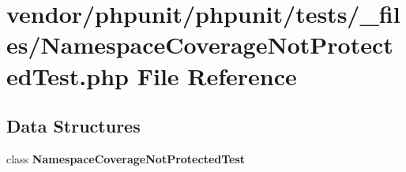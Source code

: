 \section{vendor/phpunit/phpunit/tests/\+\_\+files/\+Namespace\+Coverage\+Not\+Protected\+Test.php File Reference}
\label{phpunit_2tests_2__files_2_namespace_coverage_not_protected_test_8php}
\subsection*{Data Structures}
\begin{DoxyCompactItemize}
\item 
class {\bf Namespace\+Coverage\+Not\+Protected\+Test}
\end{DoxyCompactItemize}
